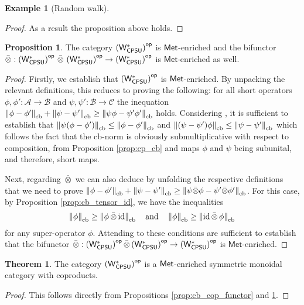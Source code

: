 \documentclass[10pt,a4paper]{amsart}
\theoremstyle{definition}
\theoremstyle{definition}
\newtheorem{example}[definition]{Example}
\theoremstyle{definition}
\theoremstyle{definition}
\newtheorem{proposition}[definition]{Proposition}
\theoremstyle{definition}
\theoremstyle{definition}
\newtheorem{theorem}[definition]{Theorem}
\begin{document}
\begin{example}[Random walk]
\begin{proof}
As a result the proposition above holds.
\end{proof}

\begin{proposition} \label{prop:cb_cat_met_otimes_met}
  The category $\left(\mathsf{W^*_{CPSU}}\right)^{\mathsf{op}}$ is $\mathsf{Met}$-enriched and the bifunctor $\bar{\otimes} : \left(\mathsf{W^*_{CPSU}}\right)^{\mathsf{op}} \, \bar{\otimes} \, \left(\mathsf{W^*_{CPSU}}\right)^{\mathsf{op}} \to \left(\mathsf{W^*_{CPSU}}\right)^{\mathsf{op}}$ is $\mathsf{Met}$-enriched as well.
\end{proposition}

\begin{proof}
  Firstly, we establish that $\left(\mathsf{W^*_{CPSU}}\right)^{\mathsf{op}}$ is $\mathsf{Met}$-enriched. By unpacking the relevant definitions, this reduces to proving the following: for all short operators $\phi, \phi' : \mathcal{A} \to \mathcal{B}$ and $\psi, \psi' : \mathcal{B} \to \mathcal{C}$ the inequation $\left\lVert \phi-\phi' \right\rVert_{\text{cb}} + \left\lVert \psi-\psi' \right\rVert_{\text{cb}} \geq \left\lVert \psi\phi-\psi'\phi' \right\rVert_{\text{cb}} $ holds. Considering \cite[ Proof of proposition 4.1]{dahlqvist2023syntactic},  it is sufficient to establish that $\left\lVert \psi(\phi-\phi') \right\rVert_{\text{cb}} \leq \left\lVert \phi-\phi' \right\rVert_{\text{cb}}$ and $\left\lVert (\psi-\psi')\phi \right\rVert_{\text{cb}} \leq \left\lVert \psi-\psi' \right\rVert_{\text{cb}}$ which follows the fact that the cb-norm is obviously submultiplicative with respect to composition, from Proposition \ref{prop:cp_cb} and maps $\phi$ and $\psi$ being subunital, and therefore, short maps.
  
  Next, regarding $\bar{\otimes}$ we can also deduce by unfolding the respective definitions that we need to prove $ \left\lVert \phi - \phi' \right\rVert_{\text{cb}} + \left\lVert \psi - \psi' \right\rVert_{\text{cb}} \geq \left\lVert \psi \bar{\otimes} \phi - \psi' \bar{\otimes} \phi' \right\rVert_{\text{cb}}$. 
  For this case,  by Proposition \ref{prop:cb_tensor_id}, we have the inequalities  
  \[
  \left\lVert \phi \right\rVert_{\text{cb}} \geq \left\lVert  \phi \, \bar{\otimes} \, \mathrm{id}  \right\rVert_{\text{cb}}
  \quad \text{and} \quad  
 \left\lVert \phi \right\rVert_{\text{cb}}  \geq \left\lVert \mathrm{id} \, \bar{\otimes} \, \phi \right\rVert_{\text{cb}}
  \]  
  for any super-operator \( \phi \). Attending to \cite[ Proof of proposition 4.1]{dahlqvist2023syntactic} these conditions are sufficient to establish that the bifunctor $\bar{\otimes} : \left(\mathsf{W^*_{CPSU}}\right)^{\mathsf{op}} \bar{\otimes} \left(\mathsf{W^*_{CPSU}}\right)^{\mathsf{op}} \to \left(\mathsf{W^*_{CPSU}}\right)^{\mathsf{op}}$ is $\mathsf{Met}$-enriched.
\end{proof}

\begin{theorem}
  The category $\left(\mathsf{W^*_{CPSU}}\right)^{\mathsf{op}}$ is a $\mathsf{Met}$-enriched symmetric monoidal category with coproducts.
\end{theorem}

\begin{proof}
  This follows directly from Propositions \ref{prop:cb_cop_functor} and \ref{prop:cb_cat_met_otimes_met}.
\end{proof}



\end{example}
\end{document}
